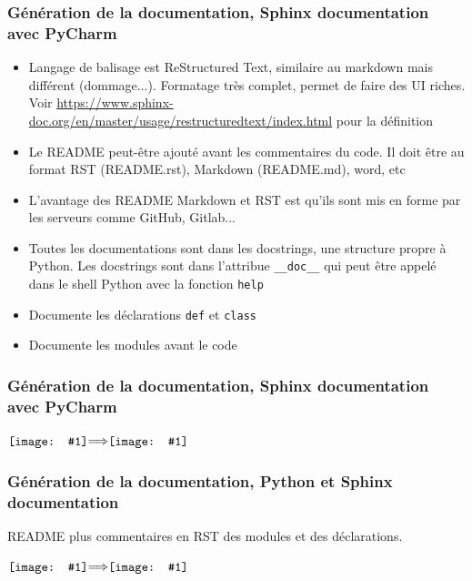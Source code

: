 \documentclass{beamer}
\newcommand*{\vcenterimage}[1]{\vcenter{\hbox{\texttt{[image: \#1]}}}}
\newcommand*{\vcenterarrow}{\vcenter{\hbox{$\Longrightarrow$}}}
\begin{document}
    \begin{frame}[fragile]
        \transdissolve
        \frametitle{Génération de la documentation, Sphinx documentation avec PyCharm}

        \begin{itemize}

            \item Langage de balisage est ReStructured Text, similaire au markdown mais différent (dommage...). Formatage très complet, permet de faire des UI riches.
            Voir \url{https://www.sphinx-doc.org/en/master/usage/restructuredtext/index.html} pour la définition
            \item Le README peut-être ajouté avant les commentaires du code.
            Il doit être au format RST (README.rst), Markdown (README.md), word, etc
            \item L'avantage des README Markdown et RST est qu'ils sont mis en forme par les serveurs comme GitHub, Gitlab...
            \item Toutes les documentations sont dans les docstrings, une structure propre à Python.
            Les docstrings sont dans l'attribue \lstinline{__doc__} qui peut être appelé dans le shell Python avec la fonction \lstinline{help}
            \item Documente les déclarations \lstinline{def} et \lstinline{class}
            \item Documente les modules avant le code

        \end{itemize}

    \end{frame}

    \begin{frame}
        \transdissolve
        \frametitle{Génération de la documentation, Sphinx documentation avec PyCharm}

        \centering
        $\vcenterimage{image/python-rst.png}\vcenterarrow\vcenterimage{image/readme-example.png}$

    \end{frame}

    \begin{frame}
        \transdissolve
        \frametitle{Génération de la documentation, Python et Sphinx documentation}
        README plus commentaires en RST des modules et des déclarations.

        \centering
        $\vcenterimage{image/python-rst-2}\vcenterarrow\vcenterimage{image/readme-plus-code.png}$

    \end{frame}
\end{document}
